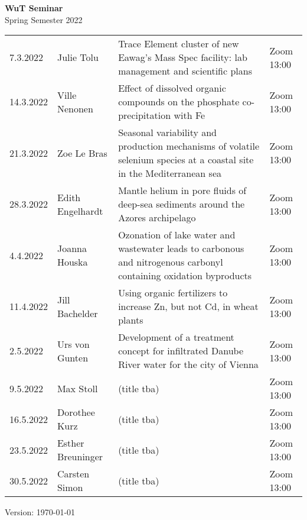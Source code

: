 \documentclass[12pt]{article}
\begin{document}
\centering

{\Huge \bf WuT Seminar}\\[1cm]
{\Large Spring Semester 2022}\\[1.8cm]




\renewcommand*\arraystretch{1.4}
\begin{tabular}{l p{3.8cm} p{8.5cm} p{2cm}}



7.3.2022
 	& Julie Tolu
 	& Trace Element cluster of new Eawag’s Mass Spec facility: lab management and scientific plans
 	& Zoom 13:00\\

14.3.2022
	& Ville Nenonen
	& Effect of dissolved organic compounds on the phosphate co-precipitation with Fe
	& Zoom 13:00\\

21.3.2022
	& Zoe Le Bras
	& Seasonal variability and production mechanisms of volatile selenium species at a coastal site in the Mediterranean sea
	& Zoom 13:00\\
	
28.3.2022
	& Edith Engelhardt
	& Mantle helium in pore fluids of deep-sea sediments around the Azores archipelago
	& Zoom 13:00\\

4.4.2022
	& Joanna Houska
	& Ozonation of lake water and wastewater leads to carbonous and nitrogenous carbonyl containing oxidation byproducts
	& Zoom 13:00\\
	
11.4.2022
	& Jill Bachelder
	& Using organic fertilizers to increase Zn, but not Cd, in wheat plants
	& Zoom 13:00\\

	

2.5.2022
	& Urs von Gunten
	& Development of a treatment concept for infiltrated Danube River water for the city of Vienna
	& Zoom 13:00\\
	
9.5.2022
	& Max Stoll %
	& (title tba)
	& Zoom 13:00\\

16.5.2022
	& Dorothee Kurz
	& (title tba)
	& Zoom 13:00\\
	
23.5.2022
	& Esther Breuninger
	& (title tba)
	& Zoom 13:00\\

30.5.2022
	& Carsten Simon
	& (title tba)
	& Zoom 13:00\\



\end{tabular}

\vfill

{\scriptsize Version: \today}
\end{document}
